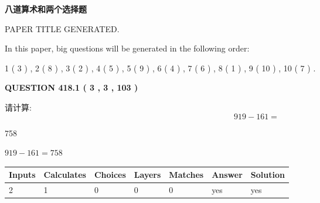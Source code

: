 \documentclass{ctexart}
\begin{document}
   
\vspace{0.2in}
   
   
   
   
   
   
   
   
 \vspace{0.2in}
{\LARGE {\textbf{ 八道算术和两个选择题}}}
   
   
 PAPER TITLE GENERATED.
   
   
   
\vspace{0.2in}
   
In this paper, big questions will be generated in the following order: 
   
   
   1 ( 3 )
 ,
   2 ( 8 )
 ,
   3 ( 2 )
 ,
   4 ( 5 )
 ,
   5 ( 9 )
 ,
   6 ( 4 )
 ,
   7 ( 6 )
 ,
   8 ( 1 )
 ,
   9 ( 10 )
 ,
   10 ( 7 )
 .
  
\vspace{0.2in}
  
{\textbf{\Large{QUESTION
418.1 
 ( 3 , 3 , 103 )
}}}
  
  
 
请计算:
\begin{equation}
919 -   %
161 = \nonumber
\end{equation}
 
 
 
\noindent{}
 
 

758
 
 
\noindent{}
 
 

 
 
 
\noindent{}
 
 

$ %
919 -  %
161=   %
758$
 
 
\noindent{}
 
 

 
   
   
   
   
\noindent\begin{tabular}{|l|l|l|l|l|l|l|}
 \hline
Inputs & Calculates & Choices & Layers & Matches & Answer & Solution \\ \hline
 2  & 
 1  & 
 0
  & 
 0  & 
 0  & 
  yes & 
  yes 
  \\ \hline
 \end{tabular}
   
\end{document}
